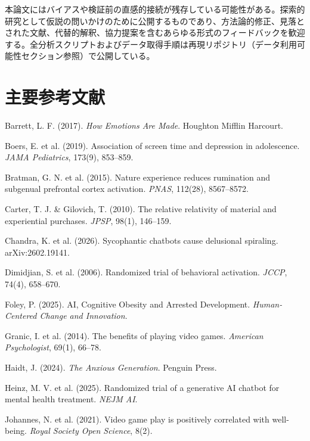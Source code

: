 \documentclass[a4paper,11pt,titlepage]{article}
\begin{document}
本論文にはバイアスや検証前の直感的接続が残存している可能性がある。探索的研究として仮説の問いかけのために公開するものであり、方法論的修正、見落とされた文献、代替的解釈、協力提案を含むあらゆる形式のフィードバックを歓迎する。全分析スクリプトおよびデータ取得手順は再現リポジトリ（データ利用可能性セクション参照）で公開している。


\section*{主要参考文献}

\begin{small}
\begin{enumerate}[label={[\arabic*]}, leftmargin=2em, itemsep=2pt]
  \item Barrett, L. F. (2017). \textit{How Emotions Are Made}. Houghton Mifflin Harcourt.
  \item Boers, E. et al. (2019). Association of screen time and depression in adolescence. \textit{JAMA Pediatrics}, 173(9), 853--859.
  \item Bratman, G. N. et al. (2015). Nature experience reduces rumination and subgenual prefrontal cortex activation. \textit{PNAS}, 112(28), 8567--8572.
  \item Carter, T. J. \& Gilovich, T. (2010). The relative relativity of material and experiential purchases. \textit{JPSP}, 98(1), 146--159.
  \item Chandra, K. et al. (2026). Sycophantic chatbots cause delusional spiraling. arXiv:2602.19141.
  \item Dimidjian, S. et al. (2006). Randomized trial of behavioral activation. \textit{JCCP}, 74(4), 658--670.
  \item Foley, P. (2025). AI, Cognitive Obesity and Arrested Development. \textit{Human-Centered Change and Innovation}.
  \item Granic, I. et al. (2014). The benefits of playing video games. \textit{American Psychologist}, 69(1), 66--78.
  \item Haidt, J. (2024). \textit{The Anxious Generation}. Penguin Press.
  \item Heinz, M. V. et al. (2025). Randomized trial of a generative AI chatbot for mental health treatment. \textit{NEJM AI}.
  \item Johannes, N. et al. (2021). Video game play is positively correlated with well-being. \textit{Royal Society Open Science}, 8(2).

\end{enumerate}
\end{small}
\end{document}
